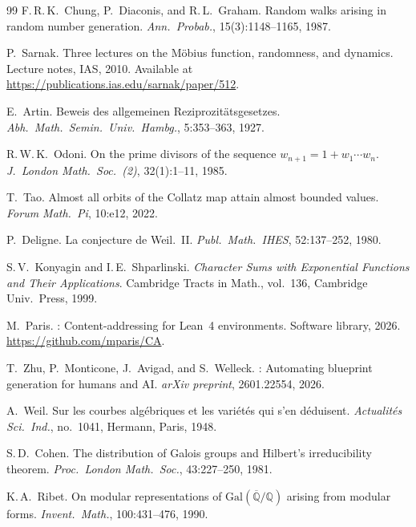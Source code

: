 \begin{thebibliography}{99}
F.\,R.\,K.~Chung, P.~Diaconis, and R.\,L.~Graham.
\newblock Random walks arising in random number generation.
\newblock \emph{Ann.\ Probab.}, 15(3):1148--1165, 1987.

P.~Sarnak.
\newblock Three lectures on the {M}\"obius function, randomness,
  and dynamics.
\newblock Lecture notes, IAS, 2010.
\newblock Available at \url{https://publications.ias.edu/sarnak/paper/512}.

E.~Artin.
\newblock Beweis des allgemeinen {R}eziprozit\"atsgesetzes.
\newblock \emph{Abh.\ Math.\ Semin.\ Univ.\ Hambg.}, 5:353--363, 1927.

R.\,W.\,K.~Odoni.
\newblock On the prime divisors of the sequence $w_{n+1} = 1 + w_1 \cdots w_n$.
\newblock \emph{J.\ London Math.\ Soc.~(2)}, 32(1):1--11, 1985.

T.~Tao.
\newblock Almost all orbits of the {C}ollatz map attain almost bounded values.
\newblock \emph{Forum Math.\ Pi}, 10:e12, 2022.

P.~Deligne.
\newblock La conjecture de {W}eil.~{II}.
\newblock \emph{Publ.\ Math.\ IHES}, 52:137--252, 1980.

S.\,V.~Konyagin and I.\,E.~Shparlinski.
\newblock \emph{Character Sums with Exponential Functions and Their Applications}.
\newblock Cambridge Tracts in Math., vol.~136, Cambridge Univ.\ Press, 1999.

M.~Paris.
: Content-addressing for {L}ean~4 environments.
\newblock Software library, 2026.
\newblock \url{https://github.com/mparis/CA}.

T.~Zhu, P.~Monticone, J.~Avigad, and S.~Welleck.
: Automating blueprint generation for humans and {AI}.
\newblock \emph{arXiv preprint}, 2601.22554, 2026.

A.~Weil.
\newblock Sur les courbes alg\'ebriques et les vari\'et\'es qui s'en d\'eduisent.
\newblock \emph{Actualit\'es Sci.\ Ind.}, no.\ 1041, Hermann, Paris, 1948.

S.\,D.~Cohen.
\newblock The distribution of {G}alois groups and {H}ilbert's irreducibility theorem.
\newblock \emph{Proc.\ London Math.\ Soc.}, 43:227--250, 1981.

K.\,A.~Ribet.
\newblock On modular representations of
  $\mathrm{Gal}(\overline{\mathbb{Q}}/\mathbb{Q})$ arising from modular forms.
\newblock \emph{Invent.\ Math.}, 100:431--476, 1990.


\end{thebibliography}
